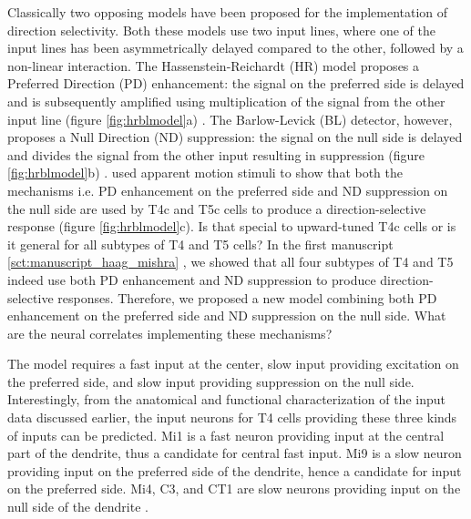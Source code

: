 Classically two opposing models have been proposed for the implementation of direction selectivity. Both these models use two input lines, where one of the input lines has been asymmetrically delayed compared to the other, followed by a non-linear interaction. The Hassenstein-Reichardt (HR) model proposes a Preferred Direction (PD) enhancement: the signal on the preferred side is delayed and is subsequently amplified using multiplication of the signal from the other input line (figure \ref{fig:hrblmodel}a) \parencite{Hassenstein1956}. The Barlow-Levick (BL) detector, however, proposes a Null Direction (ND) suppression: the signal on the null side is delayed and divides the signal from the other input resulting in suppression (figure \ref{fig:hrblmodel}b) \parencite{Barlow1965}. \cite{Haag2016} used apparent motion stimuli to show that both the mechanisms i.e. PD enhancement on the preferred side and ND suppression on the null side are used by T4c and T5c cells to produce a direction-selective response (figure \ref{fig:hrblmodel}c). Is that special to upward-tuned T4c cells or is it general for all subtypes of T4 and T5 cells? In the first manuscript \ref{sct:manuscript_haag_mishra} \parencite{Haag2017}, we showed that all four subtypes of T4 and T5 indeed use both PD enhancement and ND suppression to produce direction-selective responses. Therefore, we proposed a new model combining both PD enhancement on the preferred side and ND suppression on the null side. What are the neural correlates implementing these mechanisms? 

The model requires a fast input at the center, slow input providing excitation on the preferred side, and slow input providing suppression on the null side. Interestingly, from the anatomical and functional characterization of the input data discussed earlier, the input neurons for T4 cells providing these three kinds of inputs can be predicted. Mi1 is a fast neuron providing input at the central part of the dendrite, thus a candidate for central fast input. Mi9 is a slow neuron providing input on the preferred side of the dendrite, hence a candidate for input on the preferred side. Mi4, C3, and CT1 are slow neurons providing input on the null side of the dendrite \parencite{Arenz2017}. 

